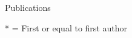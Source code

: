 \documentclass[a4paper]{article}
\begin{document}
\pagebreak
\begin{rubrique}{Publications}
\end{rubrique}

* = First or equal to first author
\end{document}
